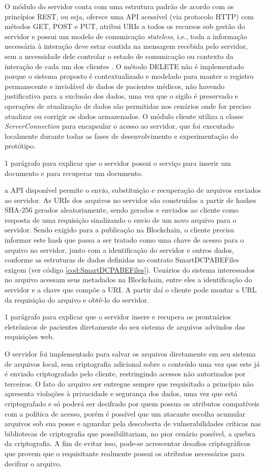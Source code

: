 \documentclass[a4paper,11pt]{article}
\begin{document}
O módulo do servidor conta com uma estrutura padrão de acordo com os princípios REST, ou seja, oferece uma API acessível (via protocolo HTTP) com métodos GET, POST e PUT, atribui URIs a todos os recursos sob gestão do servidor e possui um modelo de comunicação \emph{stateless}, i.e., toda a informação necessária à interação deve estar contida na mensagem recebida pelo servidor, sem a necessidade dele controlar o estado de comunicação ou contexto da interação de cada um dos clientes \cite{Mark2013}.
O método DELETE não é implementado porque o sistema proposto é contextualizado e modelado para manter o registro permanecente e inviolável de dados de pacientes médicos, não havendo justificativa para a exclusão dos dados, uma vez que o sigilo é preservado e operações de atualização de dados são permitidas nos cenários onde for preciso atualizar ou corrigir os dados armazenados.
O módulo cliente utiliza a classe \emph{ServerConnection} para encapsular o acesso ao servidor, que foi executado localmente durante todas as fases de desenvolvimento e experimentação do protótipo.

{\color{Magenta} 1 parágrafo para explicar que o servidor possui o serviço para inserir um documento e para recuperar um documento.}

a API disponível permite o envio, substituição e recuperação de arquivos enviados ao servidor.
As URIs dos arquivos no servidor são construídas a partir de hashes SHA-256 gerados aleatoriamente, sendo gerados e enviados ao cliente como resposta de uma requisição sinalizando o envio de um novo arquivo para o servidor.
Sendo exigido para a publicação na Blockchain, o cliente precisa informar este hash que passa a ser tratado como uma chave de acesso para o arquivo no servidor, junto com a identificação do servidor e outros dados, conforme as estruturas de dados definidas no contrato SmartDCPABEFiles exigem (ver código \ref{cod:SmartDCPABEFiles}).
Usuários do sistema interessados no arquivo acessam seus metadados na Blockchain, entre eles a identificação do servidor e a chave que compõe a URI.
A partir daí o cliente pode montar a URL da requisição do arquivo e obtê-lo do servidor.

{\color{Magenta} 1 parágrafo para explicar que o servidor insere e recupera os prontuários eletrônicos de pacientes diretamente do seu sistema de arquivos advindos das requisições web.}

O servidor foi implementado para salvar os arquivos diretamente em seu sistema de arquivos local, sem criptografia adicional sobre o conteúdo uma vez que este já é enviado criptografado pelo cliente, restringindo acessos não autorizados por terceiros.
O fato do arquivo ser entregue sempre que requisitado a princípio não apresenta violações à privacidade e segurança dos dados, uma vez que está criptografado e só poderá ser decifrado por quem possua os atributos compatíveis com a política de acesso, porém é possível que um atacante escolha acumular arquivos sob sua posse e aguardar pela descoberta de vulnerabilidades críticas nas bibliotecas de criptografia que possibilitariam, no pior cenário possível, a quebra da criptografia. A fim de evitar isso, pode-se acrescentar desafios criptográficos que provem que o requisitante realmente possui os atributos necessários para decifrar o arquivo.
\end{document}
